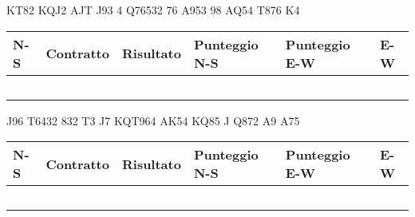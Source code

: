 \documentclass[a4paper,italian,12pt]{article}
\begin{document}
\begin{tcolorbox}
\begin{minipage}{.3\textwidth}
\newgame
{}
     {KT82} {KQJ2} {AJT}
     {J93} {4} {Q76532}
     {76} {A953} {98}
     {AQ54} {T876} {K4}

    \hspace{-.2cm}\showAll
\end{minipage}
\begin{minipage}{.7\textwidth}

\renewcommand{\arraystretch}{2}
\begin{tabular}{|l|l|l|l|l|l|}
\hline
N-S & Contratto\hspace{1.5cm} & Risultato& Punteggio N-S & Punteggio E-W & E-W\\\hline
  &&&&&\\\hline
   &&&&&\\\hline
    &&&&&\\\hline
     &&&&&\\\hline
          &&&&&\\\hline
\end{tabular}
\end{minipage}
\end{tcolorbox}

\medskip

\begin{tcolorbox}
\begin{minipage}{.3\textwidth}
\newgame
{}
     {J96} {T6432} {832}
     {T3} {J7} {KQT964}
     {AK54} {KQ85} {J}
     {Q872} {A9} {A75}
    \hspace{-.2cm}\showAll
\end{minipage}
\begin{minipage}{.7\textwidth}

\renewcommand{\arraystretch}{2}
\begin{tabular}{|l|l|l|l|l|l|}
\hline
N-S & Contratto\hspace{1.5cm} & Risultato& Punteggio N-S & Punteggio E-W & E-W\\\hline
  &&&&&\\\hline
   &&&&&\\\hline
    &&&&&\\\hline
     &&&&&\\\hline
          &&&&&\\\hline
\end{tabular}
\end{minipage}
\end{tcolorbox}
\end{document}
